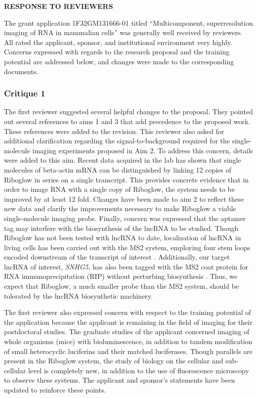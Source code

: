 


\begin{center}
{\bf RESPONSE TO REVIEWERS}
\end{center}
The grant application 1F32GM131666-01 titled ``Multicomponent, superresolution imaging of RNA in mammalian cells'' was generally well received by reviewers. All rated the applicant, sponsor, and institutional environment very highly. Concerns expressed with regards to the research proposal and the training potential are addressed below, and changes were made to the corresponding documents.

\subsubsection*{Critique 1}
The first reviewer suggested several helpful changes to the proposal. They pointed out several references to aims 1 and 3 that add precedence to the proposed work. These references were added to the revision. This reviewer also asked for additional clarification regarding the signal-to-background required for the single-molecule imaging experiments proposed in Aim 2. To address this concern, details were added to this aim. Recent data acquired in the lab has shown that single molecules of beta-actin mRNA can be distinguished by linking 12 copies of Riboglow in series on a single transcript. This provides concrete evidence that in order to image RNA with a single copy of Riboglow, the system needs to be improved by at least 12 fold. Changes have been made to aim 2 to reflect these new data and clarify the improvements necessary to make Riboglow a viable single-molecule imaging probe. Finally, concern was expressed that the aptamer tag may interfere with the biosynthesis of the lncRNA to be studied. Though Riboglow has not been tested with lncRNA to date, localization of lncRNA in living cells has been carried out with the MS2 system, employing four stem loops encoded downstream of the transcript of interest \cite{YoonLincRNAp21SuppressesTarget2012}. Additionally, our target lncRNA of interest, \textit{SNHG5}, has also been tagged with the MS2 coat protein for RNA immunoprecipitation (RIP) without perturbing biosynthesis \cite{HeLncRNASNHG5regulates2017}. Thus, we expect that Riboglow, a much smaller probe than the MS2 system, should be tolerated by the lncRNA biosynthetic machinery.

The first reviewer also expressed concern with respect to the training potential of the application because the applicant is remaining in the field of imaging for their postdoctoral studies. The graduate studies of the applicant concerned imaging of whole organisms (mice) with bioluminescence, in addition to tandem modification of small heterocyclic luciferins and their matched luciferases. Though parallels are present in the Riboglow system, the study of biology on the cellular and sub-cellular level is completely new, in addition to the use of fluorescence microscopy to observe these systems. The applicant and sponsor's statements have been updated to reinforce these points.

